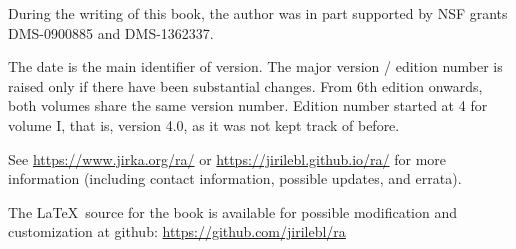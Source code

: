 \documentclass[12pt]{book}
\theoremstyle{plain}
\theoremstyle{remark}
\theoremstyle{definition}
\theoremstyle{exercise}
\theoremstyle{example}
\begin{document}
\bigskip

\noindent
During the writing of this book, 
the author was in part supported by NSF grants DMS-0900885 and
DMS-1362337.

\bigskip

\noindent
The date is the main identifier of version.  The major version / edition
number is raised only if there have been substantial changes.
From 6th edition onwards, both volumes share the same version number.
Edition
number started at 4 for volume I, that is, version 4.0, as it was not kept track of
before.  %

\bigskip

\noindent
See \url{https://www.jirka.org/ra/} or \url{https://jirilebl.github.io/ra/} for more information
(including contact information, possible updates, and errata).

\bigskip

\noindent
The \LaTeX\ source for the book is available
for possible modification and customization
at github: \url{https://github.com/jirilebl/ra}



\tableofcontents
{}

\newpage




\newcommand{\VolOneIntroExtrahead}{
\subsection{About Volume I}
}

\newcommand{\VolTwoIntro}{
\subsection{About Volume II}


}






\end{document}
